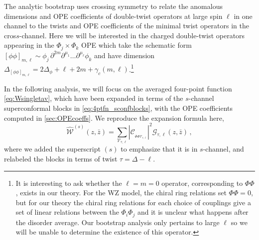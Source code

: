 \documentclass[11pt]{article}
\newcommand{\zb}{\bar{z}}
\newcommand{\Phib}{\overline{\Phi}}
\newcommand{\cope}[1]{\mathcal{C}_{_{#1}}}
\begin{document}
The analytic bootstrap \cite{Fitzpatrick:2012yx, Komargodski:2012ek, Li:2015rfa} uses crossing symmetry to relate the anomalous dimensions and OPE coefficients of double-twist operators at large spin $\ell$ in one channel to the twists and OPE coefficients of the minimal twist operators in the cros$s$-channel. Here we will be interested in the charged double-twist operators appearing in the $\Phi_j \times \Phi_k$ OPE which take the schematic form $[\phi\phi]_{m,\ell} \sim \phi_j\,\partial^{2m}\partial^{\mu_{1}}\ldots\partial^{\mu_{\ell}}\phi_k$ and have dimension $\Delta_{[\phi\phi]_{m,\ell}} = 2\Delta_{\phi}+\ell+2m+\gamma_{c}(m,\ell)$.\footnote{It is interesting to ask whether the $\ell=m=0$ operator, corresponding to $\Phi\Phi$, exists in our theory. For the WZ model, the chiral ring relations set $\Phi\Phi = 0$, but for our theory the chiral ring relations for each choice of couplings give a set of linear relations between the $\Phi_{i}\Phi_{j}$ and it is unclear what happens after the disorder average. Our bootstrap analysis only pertains to large $\ell$ so we will be unable to determine the existence of this operator.}

In the following analysis, we will focus on the averaged four-point function \eqref{eq:Wsingletav}, which have been expanded in terms of the $s$-channel superconformal blocks in \eqref{eq:4ptfn_sconfblocks}, with the OPE coefficients computed in \cref{sec:OPEcoeffs}. We reproduce the expansion formula  here,
%
\begin{equation}\label{eq:4ptfn_sconfblocksB}
\widehat{\mathcal{W}}^{(s)}(z,\zb)=\sum_{\mathcal{V}_{\tau,\ell}}\left|\cope{\Phib\Phi\mathcal{V}_{\tau,\ell}}\right|^2 \mathcal{G}_{\tau,\ell}(z,\zb)\,,
\end{equation}
%
where we added the superscript $(s)$ to emphasize that it is in $s$-channel, and relabeled the blocks in terms of twist $\tau=\Delta-\ell$.
\end{document}
